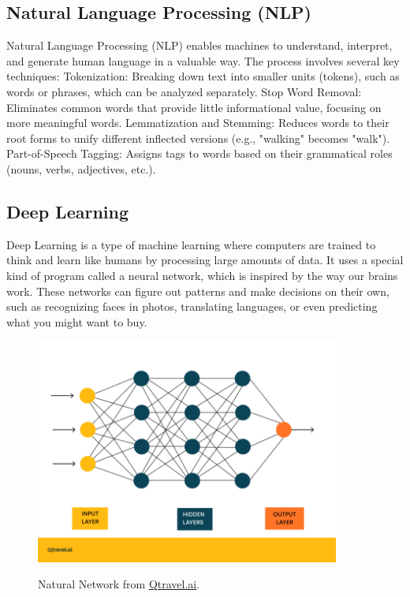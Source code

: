 \documentclass[12pt,oneside,openright,a4paper]{cpe-english-project}
\begin{document}
\subsection{Natural Language Processing (NLP)} Natural Language Processing (NLP) enables machines to understand, interpret, and generate human language in a valuable way. The process involves several key techniques: Tokenization: Breaking down text into smaller units (tokens), such as words or phrases, which can be analyzed separately. Stop Word Removal: Eliminates common words that provide little informational value, focusing on more meaningful words. Lemmatization and Stemming: Reduces words to their root forms to unify different inflected versions (e.g., "walking" becomes "walk"). Part-of-Speech Tagging: Assigns tags to words based on their grammatical roles (nouns, verbs, adjectives, etc.).

\subsection{Deep Learning} Deep Learning is a type of machine learning where computers are trained to think and learn like humans by processing large amounts of data. It uses a special kind of program called a neural network, which is inspired by the way our brains work. These networks can figure out patterns and make decisions on their own, such as recognizing faces in photos, translating languages, or even predicting what you might want to buy.

\begin{figure}[H]
\centering
\includegraphics[width=10cm]{./assets/Natural-Network.png}
\label{fig:Natural-Network}
\caption{Natural Network from 
\href{https://www.qtravel.ai/wp-content/uploads/2023/07/sieci-neuronowe-grafika-768x570.png}{Qtravel.ai}.}
\end{figure}
\end{document}
